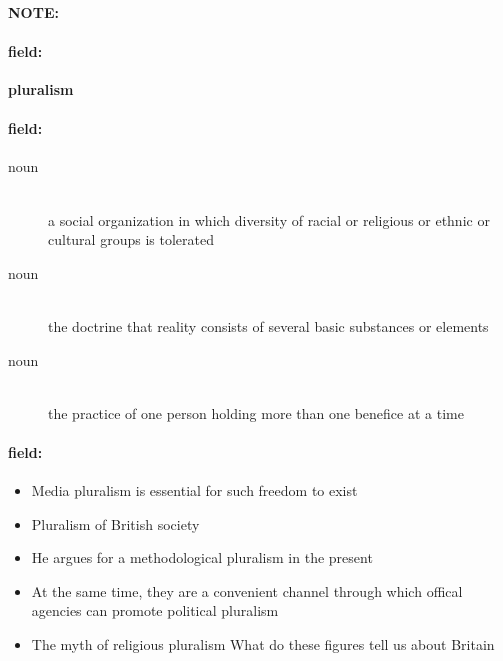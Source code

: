 \documentclass[12pt]{article}
\newenvironment{note}{\paragraph{NOTE:}}{}
\newenvironment{field}{\paragraph{field:}}{}
\begin{document}
\begin{note}
\begin{field}
\textbf{\large pluralism}
\end{field}


\begin{field}
\begin{description}
\item[noun] \hfill \\ 
a social organization in which diversity of racial or religious or ethnic or cultural groups is tolerated

\item[noun] \hfill \\ 
the doctrine that reality consists of several basic substances or elements

\item[noun] \hfill \\ 
the practice of one person holding more than one benefice at a time

\end{description}
\end{field}

\begin{field}
\begin{itemize}
\item Media pluralism is essential for such freedom to exist
\item Pluralism of British society
\item He argues for a methodological pluralism in the present
\item At the same time, they are a convenient channel through which offical agencies can promote political pluralism
\item The myth of religious pluralism What do these figures tell us about Britain
\end{itemize}
\end{field}
\end{note}
\end{document}
